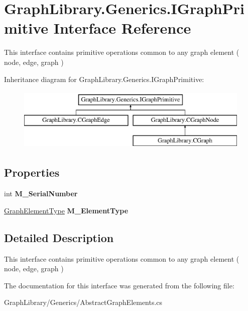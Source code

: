 \hypertarget{interface_graph_library_1_1_generics_1_1_i_graph_primitive}{}\section{Graph\+Library.\+Generics.\+I\+Graph\+Primitive Interface Reference}
\label{interface_graph_library_1_1_generics_1_1_i_graph_primitive}


This interface contains primitive operations common to any graph element ( node, edge, graph )  


Inheritance diagram for Graph\+Library.\+Generics.\+I\+Graph\+Primitive\+:\begin{figure}[H]
\begin{center}
\leavevmode
\includegraphics[height=3.000000cm]{interface_graph_library_1_1_generics_1_1_i_graph_primitive}
\end{center}
\end{figure}
\subsection*{Properties}
\begin{DoxyCompactItemize}
\item 
\hypertarget{interface_graph_library_1_1_generics_1_1_i_graph_primitive_a2d4ac2fb9b0322a490f620c18bd91eaa}{}int {\bfseries M\+\_\+\+Serial\+Number}\label{interface_graph_library_1_1_generics_1_1_i_graph_primitive_a2d4ac2fb9b0322a490f620c18bd91eaa}

\item 
\hypertarget{interface_graph_library_1_1_generics_1_1_i_graph_primitive_a36eba4009bc50f09849dce0ea3657f7f}{}\hyperlink{namespace_graph_library_1_1_generics_a919a165f16deccdd1b3d7e8a93423fbc}{Graph\+Element\+Type} {\bfseries M\+\_\+\+Element\+Type}\label{interface_graph_library_1_1_generics_1_1_i_graph_primitive_a36eba4009bc50f09849dce0ea3657f7f}

\end{DoxyCompactItemize}


\subsection{Detailed Description}
This interface contains primitive operations common to any graph element ( node, edge, graph ) 



The documentation for this interface was generated from the following file\+:\begin{DoxyCompactItemize}
\item 
Graph\+Library/\+Generics/Abstract\+Graph\+Elements.\+cs\end{DoxyCompactItemize}

